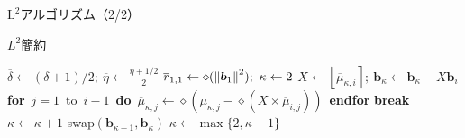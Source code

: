 \documentclass[12pt,aspectratio=169,table,dvipdfmx, leqno]{beamer}
\newcommand{\round}[1]{\left\lfloor #1 \right\rceil}
\begin{document}
\begin{frame}{$\text{L}^2$アルゴリズム（2/2）}
\begin{algorithm}[H]
    \footnotesize
    \begin{algorithmic}[1]
        \caption{\footnotesize $L^2$簡約\cite{NS05}}
        \label{alg_L2_2}
        \State $\overline{\delta}\gets(\delta+1)/2;~\overline{\eta}\gets\frac{\eta+1/2}{2}$
        \State $\overline{r}_{1,1}\gets\diamond(\norm{\bm{b}_1}^2);~\kappa\gets 2$
            \Loop
                        $X\gets \round{\overline{\mu}_{\kappa, i}};~\bm{b}_\kappa\gets\bm{b}_\kappa-X\bm{b}_i$
                        \State \textbf{for}~$j=1$~to~$i-1$~\textbf{do}~$\overline{\mu}_{\kappa, j}\gets\diamond(\mu_{\kappa, j}-\diamond(X\times \overline{\mu}_{i, j}))$~\textbf{endfor}
                    \EndFor
                \Else \textbf{break}
                \EndIf
            \EndLoop
                \State $\kappa\gets\kappa+1$
            \Else
                \State swap$(\bm{b}_{\kappa-1}, \bm{b}_\kappa)$
                \State $\kappa\gets \max\{2, \kappa-1\}$
            \EndIf
        \EndWhile
    \end{algorithmic}
\end{algorithm}
\end{frame}
\fi
\end{document}
